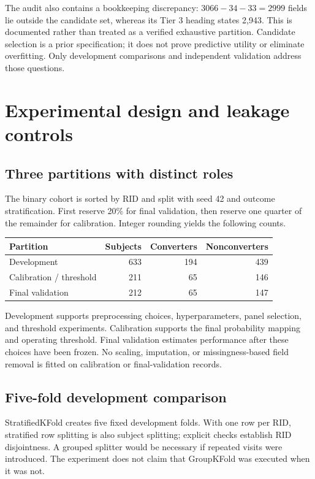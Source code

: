 \documentclass[11pt,a4paper]{article}
\begin{document}
The audit also contains a bookkeeping discrepancy: $3066-34-33=2999$ fields lie outside the candidate set, whereas its Tier 3 heading states 2,943. This is documented rather than treated as a verified exhaustive partition. Candidate selection is a prior specification; it does not prove predictive utility or eliminate overfitting. Only development comparisons and independent validation address those questions.

\clearpage
\section{Experimental design and leakage controls}
\subsection{Three partitions with distinct roles}
The binary cohort is sorted by RID and split with seed 42 and outcome stratification. First reserve 20\% for final validation, then reserve one quarter of the remainder for calibration. Integer rounding yields the following counts.
\begin{center}\small\renewcommand{\arraystretch}{1.15}
\begin{tabular}{lrrr}\toprule
Partition & Subjects & Converters & Nonconverters\\\midrule
Development & 633 & 194 & 439\\
Calibration / threshold & 211 & 65 & 146\\
Final validation & 212 & 65 & 147\\
\bottomrule\end{tabular}\end{center}
Development supports preprocessing choices, hyperparameters, panel selection, and threshold experiments. Calibration supports the final probability mapping and operating threshold. Final validation estimates performance after these choices have been frozen. No scaling, imputation, or missingness-based field removal is fitted on calibration or final-validation records.
\subsection{Five-fold development comparison}
StratifiedKFold creates five fixed development folds. With one row per RID, stratified row splitting is also subject splitting; explicit checks establish RID disjointness. A grouped splitter would be necessary if repeated visits were introduced. The experiment does not claim that GroupKFold was executed when it was not.
\end{document}
